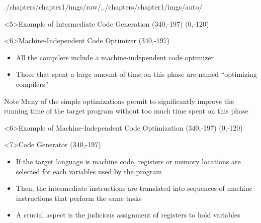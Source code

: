 \begin{graphicspathcontext}{{./chapters/chapter1/imgs/raw/},{./chapters/chapter1/imgs/auto/}}
\begin{bibunit}[apalike]
\begin{frame}<5>{Example of Intermediate Code Generation}
	\putat*(340,-197){}
	\putat(0,-120){}
\end{frame}

\begin{frame}<6>{{Machine-Independent Code} Optimizer}
	\putat*(340,-197){}
	\begin{minipage}{.8\linewidth}
		\vspace{.5cm}
		\begin{itemize}
		\item All the compilers include a machine-independent code optimizer
		\item Those that spent a large amount of time on this phase are named ``optimizing compilers''
		\end{itemize}
		\vspace{.5cm}
		\begin{block}{Note}
			Many of the simple optimizations permit to significantly improve the running time of the target program without too much time spent on this phase
		\end{block}
	\end{minipage}
\end{frame}


\begin{frame}<6>{Example of Machine-Independent Code Optimization}
	\putat*(340,-197){}
	\putat(0,-120){}
\end{frame}

\begin{frame}<7>{Code Generator}
	\putat*(340,-197){}
	\begin{minipage}{.8\linewidth}
		\vspace{.5cm}
		\begin{itemize}
		\item If the target language is machine code, registers or memory locations are selected for each variables used by the program
		\item Then, the intermediate instructions are translated into sequences of machine instructions that perform the same tasks
		\vspace{.5cm}
		\item A crucial aspect is the judicious assignment of registers to hold variables
		\end{itemize}
	\end{minipage}
\end{frame}


\end{bibunit}
\end{graphicspathcontext}
